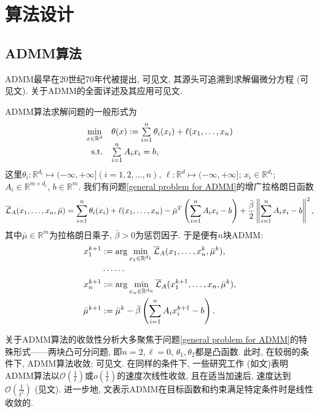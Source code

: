 \section{算法设计}\label{algorithm}
\subsection{ADMM算法}
\par ADMM最早在20世纪70年代被提出, 可见文\cite{Glowinski1975Sur,Gabay1976A}, 其源头可追溯到求解偏微分方程 (可见文\cite{Boyd2011Distributed}). 关于ADMM的全面详述及其应用可见文\cite{Boyd2011Distributed}.
\par ADMM算法求解问题的一般形式为
\begin{equation}
	\begin{array}{rl}
	\min\limits_{x\in\mathbb{R}^d} & \theta(x):=\sum\limits_{i=1}^n\theta_i(x_i)+\ell(x_1,\ldots,x_n)\\
	\mathrm{s.t.} & \sum\limits_{i=1}^nA_ix_i=b,
	\end{array}
	\label{general problem for ADMM}
\end{equation}
这里$\theta_i:\mathbb{R}^{d_i}\mapsto(-\infty,+\infty](i=1,2,\ldots,n)$, $\ell:\mathbb{R}^d\mapsto(-\infty,+\infty]$; $x_i\in\mathbb{R}^{d_i}$; $A_i\in\mathbb{R}^{m\times d_i}$, $b\in\mathbb{R}^m$. 我们有问题\eqref{general problem for ADMM}的增广拉格朗日函数
$$\overline{\mathcal{L}}_A(x_1,\ldots,x_n,\bar\mu)=\sum\limits_{i=1}^n\theta_i(x_i)+\ell(x_1,\ldots,x_n)-\bar\mu^T\left(\sum\limits_{i=1}^nA_ix_i-b\right)+\frac{\bar\beta}{2}\left\Vert\sum\limits_{i=1}^nA_ix_i-b\right\Vert^2,$$
其中$\bar\mu\in\mathbb{R}^m$为拉格朗日乘子, $\bar\beta>0$为惩罚因子. 于是便有$n$块ADMM:
$$\begin{aligned}
	x_1^{k+1}&:=\arg\min\limits_{x_1\in\mathbb{R}^{d_1}}\overline{\mathcal{L}}_A(x_1,\ldots,x_n^k,\bar\mu^k),\\
	&\cdots\cdots\\
	x_n^{k+1}&:=\arg\min\limits_{x_n\in\mathbb{R}^{d_n}}\overline{\mathcal{L}}_A(x_1^{k+1},\ldots,x_n,\bar\mu^k),\\
	\bar\mu^{k+1}&:=\bar\mu^k-\bar\beta\left(\sum\limits_{i=1}^nA_ix_i^{k+1}-b\right).
\end{aligned}$$
\par 关于ADMM算法的收敛性分析大多聚焦于问题\eqref{general problem for ADMM}的特殊形式——两块凸可分问题, 即$n=2,\ell=0$, $\theta_1,\theta_2$都是凸函数. 此时, 在较弱的条件下, ADMM算法收敛; 可见文\cite{Boyd2011Distributed}. 在同样的条件下, 一些研究工作 (如文\cite{He2012On,Monteiro2013Iteration,Davis2014COnvergence})表明ADMM算法以$\mathcal{O}(\frac{1}{t})$或$o(\frac{1}{t})$的速度次线性收敛, 且在适当加速后, 速度达到$\mathcal{O}(\frac{1}{t^2})$ (见文\cite{Goldstein2014Fast,Goldfarb2012Fast}). 进一步地, 文\cite{Deng2012On}表示ADMM在目标函数和约束满足特定条件时是线性收敛的.
